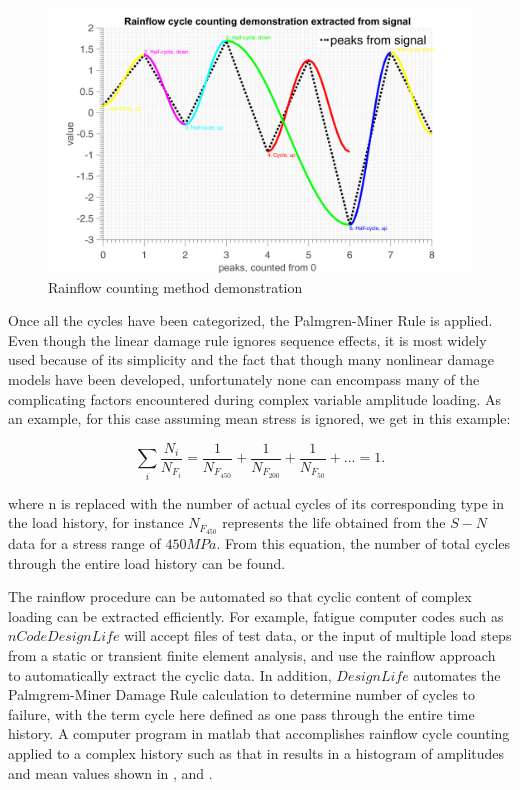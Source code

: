 \begin{figure}[!h]
	\centering
	\includegraphics[width=\textwidth]{figures//rfdemo.png} 
	\caption{Rainflow counting method demonstration}
	\label{rfdemo}
\end{figure}  

Once all the cycles have been categorized, the Palmgren-Miner Rule is applied. Even though the linear damage rule ignores sequence effects, it is most widely used because of its simplicity and the fact that though many nonlinear damage models have been developed, unfortunately none can encompass many of the complicating factors encountered during complex variable amplitude loading. As an example, for this case assuming mean stress is ignored, we get in this example:

$$\sum_i \frac{N_i}{N_{F_i}}=\frac{1}{N_{F_{450}}}+\frac{1}{N_{F_{200}}}+\frac{1}{N_{F_{50}}}+...=1.$$

where n is replaced with the number of actual cycles of its corresponding type in the load history, for instance $N_{F_{450}}$ represents the life obtained from the $S-N$ data for a stress range of $450MPa$.  From this equation, the number of total cycles through the entire load history can be found.

The rainflow procedure can be automated so that cyclic content of complex loading can be extracted efficiently.  For example, fatigue computer codes such as $nCode DesignLife$ will accept files of test data, or the input of multiple load steps from a static or transient finite element analysis, and use the rainflow approach to automatically extract the cyclic data.  In addition, $DesignLife$ automates the Palmgrem-Miner Damage Rule calculation to determine number of cycles to failure, with the term cycle here defined as one pass through the entire time history. A computer program in matlab that accomplishes rainflow cycle counting applied to a complex history such as that in  results in a histogram of amplitudes and mean values shown in ,  and .

